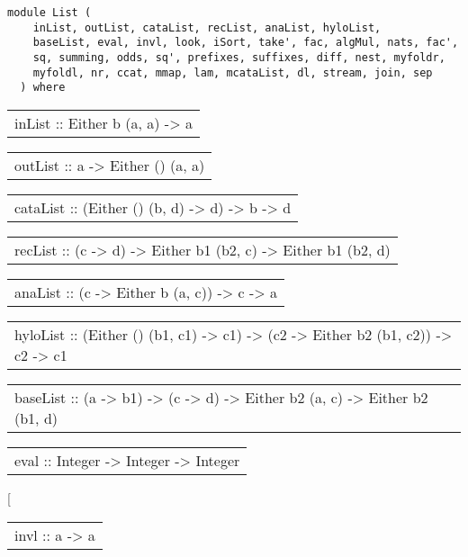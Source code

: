 \label{module:List}
\haddockbeginheader
{\haddockverb\begin{verbatim}
module List (
    inList, outList, cataList, recList, anaList, hyloList,
    baseList, eval, invl, look, iSort, take', fac, algMul, nats, fac',
    sq, summing, odds, sq', prefixes, suffixes, diff, nest, myfoldr,
    myfoldl, nr, ccat, mmap, lam, mcataList, dl, stream, join, sep
  ) where\end{verbatim}}
\haddockendheader

\begin{haddockdesc}
\item[\begin{tabular}{@{}l}
inList :: Either b (a, {\char 91}a{\char 93}) -> {\char 91}a{\char 93}
\end{tabular}]
\item[\begin{tabular}{@{}l}
outList :: {\char 91}a{\char 93} -> Either () (a, {\char 91}a{\char 93})
\end{tabular}]
\item[\begin{tabular}{@{}l}
cataList :: (Either () (b, d) -> d) -> {\char 91}b{\char 93} -> d
\end{tabular}]
\item[\begin{tabular}{@{}l}
recList :: (c -> d) -> Either b1 (b2, c) -> Either b1 (b2, d)
\end{tabular}]
\item[\begin{tabular}{@{}l}
anaList :: (c -> Either b (a, c)) -> c -> {\char 91}a{\char 93}
\end{tabular}]
\item[\begin{tabular}{@{}l}
hyloList :: (Either () (b1, c1) -> c1) -> (c2 -> Either b2 (b1, c2)) -> c2 -> c1
\end{tabular}]
\item[\begin{tabular}{@{}l}
baseList :: (a -> b1) -> (c -> d) -> Either b2 (a, c) -> Either b2 (b1, d)
\end{tabular}]
\item[\begin{tabular}{@{}l}
eval :: Integer -> {\char 91}Integer{\char 93} -> Integer
\end{tabular}]
\item[\begin{tabular}{@{}l}
invl :: {\char 91}a{\char 93} -> {\char 91}a{\char 93}

\end{tabular}
\end{haddockdesc}
